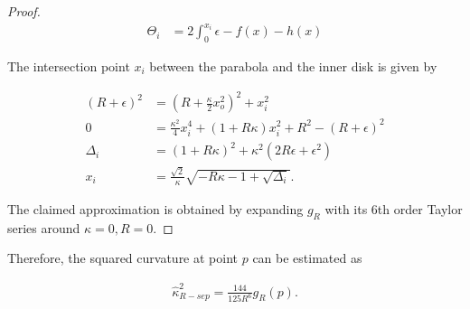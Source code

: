 \begin{proof}
\begin{align*}
	\Theta_i &= 2\int_{0}^{x_i}{\epsilon - f(x) - h(x)}	\end{align*}

The intersection point $x_i$ between the parabola and the inner disk is given by
	
\begin{align*}
	(R+\epsilon)^2 &= (R+\frac{\kappa}{2}x_o^2)^2 + x_i^2\\
	0 &= \frac{\kappa^2}{4}x_i^4 + (1+R\kappa)x_i^2 + R^2 - (R+\epsilon)^2	\\
\Delta_i &= (1+R\kappa)^2 + \kappa^2(2R\epsilon + \epsilon^2)\\
x_i &= \frac{\sqrt{2}}{\kappa}\sqrt{-R\kappa-1+\sqrt{\Delta_i}}.
\end{align*}

The claimed approximation is obtained by expanding $g_R$ with its  6th order Taylor series around $\kappa=0,R=0$.
\end{proof}

Therefore, the squared curvature at point $p$ can be estimated as

\begin{align*}
	\hat{\kappa}_{R-sep} ^2 = \frac{144}{125R^6}g_R(p) .
\end{align*}
